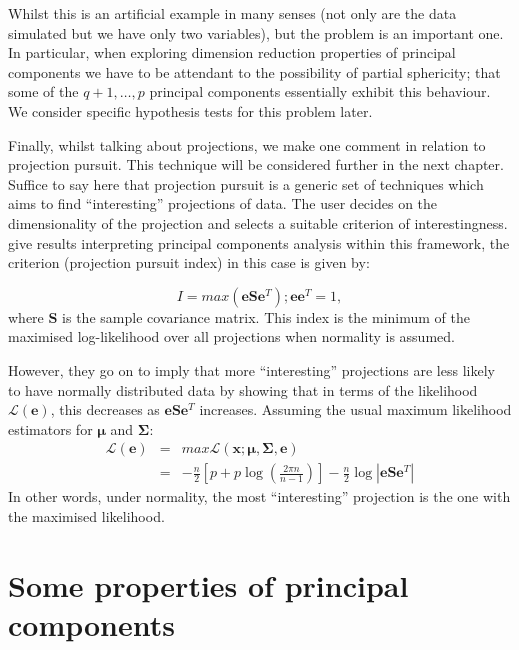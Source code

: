 Whilst this is an artificial example in many senses (not only are the data simulated but we have only two variables), but the problem is an important one.   In particular, when exploring dimension reduction properties of principal components we have to be attendant to the possibility of partial sphericity; that some of the $q+1, \ldots, p$ principal components essentially exhibit this behaviour.   We consider specific hypothesis tests for this problem later.


Finally, whilst talking about projections, we make one comment in relation to projection pursuit.   This technique will be considered further in the next chapter.   Suffice to say here that projection pursuit is a generic set of techniques which aims to find ``interesting'' projections of data.   The user decides on the dimensionality of the projection and selects a suitable criterion of interestingness.  \cite{Bolton+Krzanowski:1999} give results interpreting principal components analysis within this framework, the criterion (projection pursuit index) in this case is given by:

\begin{displaymath}
I = max(\boldsymbol{e} \boldsymbol{S} \boldsymbol{e}^{T}); \boldsymbol{e}\boldsymbol{e}^{T}=1,
\end{displaymath}
where $\boldsymbol{S}$ is the sample covariance matrix.   This index is the minimum of the maximised log-likelihood over all projections when normality is assumed.

However, they go on to imply that more ``interesting'' projections are less likely to have normally distributed data by showing that in terms of the likelihood$\mathscr{L}(\boldsymbol{e})$, this decreases as $\boldsymbol{e} \boldsymbol{S} \boldsymbol{e}^{T}$ increases.  Assuming the usual maximum likelihood estimators for $\boldsymbol{\mu}$ and $\boldsymbol{\Sigma}$:
\begin{eqnarray*}
\mathscr{L}(\boldsymbol{e}) &=& max \mathscr{L} (\boldsymbol{x}; \boldsymbol{\mu}, \boldsymbol{\Sigma}, \boldsymbol{e})\\
&=& - \frac{n}{2} \left[ p + p \log \left(\frac{2 \pi n}{n-1}\right) \right] - \frac{n}{2} \log |\boldsymbol{e} \boldsymbol{S} \boldsymbol{e}^{T}|
\end{eqnarray*}
In other words, under normality, the most ``interesting'' projection is the one with the maximised likelihood.


\section{Some properties of principal components}

